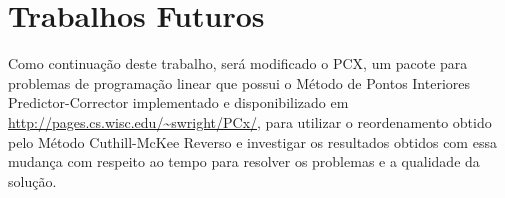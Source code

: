 \section{Trabalhos Futuros}
Como continuação deste trabalho, será modificado o PCX, um pacote para
problemas de programação linear que possui o Método de Pontos Interiores
Predictor-Corrector implementado e disponibilizado em 
\url{http://pages.cs.wisc.edu/~swright/PCx/}, para utilizar o reordenamento
obtido pelo Método Cuthill-McKee Reverso e investigar os resultados obtidos com
essa mudança com respeito ao tempo para resolver os problemas e a qualidade da
solução.
